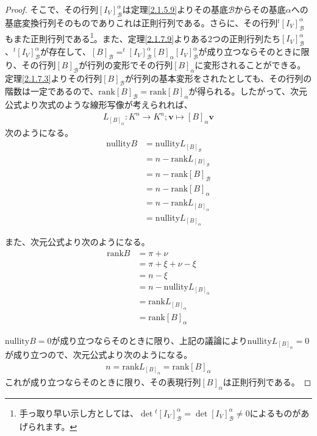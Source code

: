\documentclass[dvipdfmx]{jsarticle}
\begin{document}
\begin{proof}
そこで、その行列$\left[ I_{V} \right]^{\alpha}_{\mathcal{B}}$は定理\ref{2.1.5.9}よりその基底$\mathcal{B}$からその基底$\alpha$への基底変換行列そのものでありこれは正則行列である。さらに、その行列$^{t}\left[ I_{V} \right]^{\alpha}_{\mathcal{B}}$もまた正則行列である\footnote{手っ取り早い示し方としては、$\det{^{t}\left[ I_{V} \right]^{\alpha}_{\mathcal{B}}} = \det\left[ I_{V} \right]^{\alpha}_{\mathcal{B}} \neq 0$によるものがあげられます。}。また、定理\ref{2.1.7.9}よりある2つの正則行列たち$\left[ I_{V} \right]^{\alpha}_{\mathcal{B}}$、$^{t}\left[ I_{V} \right]^{\alpha}_{\mathcal{B}}$が存在して、$[ B]_{\mathcal{B}} =^{t}\left[ I_{V} \right]^{\alpha}_{\mathcal{B}}[ B]_{\alpha}\left[ I_{V} \right]^{\alpha}_{\mathcal{B}}$が成り立つならそのときに限り、その行列$[ B]_{\mathcal{B}}$が行列の変形でその行列$[ B]_{\alpha}$に変形されることができる。定理\ref{2.1.7.3}よりその行列$[ B]_{\mathcal{B}}$が行列の基本変形をされたとしても、その行列の階数は一定であるので、${\mathrm{rank}}[ B]_{\mathcal{B}} = {\mathrm{rank}}[ B]_{\alpha}$が得られる。したがって、次元公式より次式のような線形写像が考えられれば、
\begin{align*}
L_{[ B]_{\alpha}}:K^{n} \rightarrow K^{n};\mathbf{v} \mapsto [ B]_{\alpha}\mathbf{v}
\end{align*}
次のようになる。
\begin{align*}
{\mathrm{nullity}}B &= {\mathrm{nullity}}L_{[ B]_{\mathcal{B}}}\\
&= n - {\mathrm{rank}}L_{[ B]_{\mathcal{B}}}\\
&= n - {\mathrm{rank}}[ B]_{\mathcal{B}}\\
&= n - {\mathrm{rank}}[ B]_{\alpha}\\
&= n - {\mathrm{rank}}L_{[ B]_{\alpha}}\\
&= {\mathrm{nullity}}L_{[ B]_{\alpha}}
\end{align*}\par
また、次元公式より次のようになる。
\begin{align*}
{\mathrm{rank}}B &= \pi + \nu\\
&= \pi + \xi + \nu - \xi\\
&= n - \xi\\
&= n - {\mathrm{nullity}}L_{[ B]_{\alpha}}\\
&= {\mathrm{rank}}L_{[ B]_{\alpha}}\\
&= {\mathrm{rank}}[ B]_{\alpha}
\end{align*}\par
${\mathrm{nullity}}B = 0$が成り立つならそのときに限り、上記の議論により${\mathrm{nullity}}L_{[ B]_{\alpha}} = 0$が成り立つので、次元公式より次のようになる。
\begin{align*}
n = {\mathrm{rank}}L_{[ B]_{\alpha}} = {\mathrm{rank}}[ B]_{\alpha}
\end{align*}
これが成り立つならそのときに限り、その表現行列$[ B]_{\alpha}$は正則行列である。
\end{proof}
\end{document}

